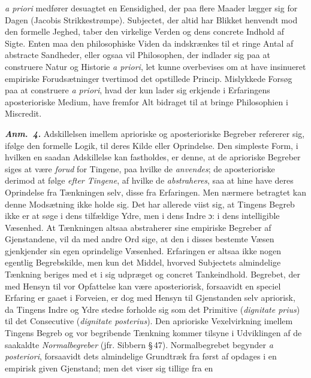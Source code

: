 \documentclass[12pt]{book}
\newcommand{\anm}[1]{\emph{\textbf{Anm.~#1.}}}
\newcommand{\dsi}{\textup{ɔ:}}
\newcommand{\opage}[1]{\marginnote{\footnotesize\textit{[#1]}}}
\begin{document}
\textit{a priori} medfører desuagtet en Eensidighed, der paa flere Maader
lægger sig for Dagen (Jacobis Strikkestrømpe). Subjectet, der altid har
Blikket henvendt mod den formelle Jeghed, taber den virkelige Verden og dens
concrete Indhold af Sigte. Enten maa den philosophiske Viden da indskrænkes
til et ringe Antal af abstracte Sandheder, eller ogsaa vil Philosophen, der
indlader sig paa at construere Natur og Historie \textit{a priori}, let kunne
overbevises om at have insinueret empiriske Forudsætninger tvertimod det
opstillede Princip. Mislykkede Forsøg paa at construere \textit{a priori},
hvad der kun lader sig erkjende i Erfaringens aposterioriske Medium, have
fremfor Alt bidraget til at bringe Philosophien i Miscredit.

\anm{4} Adskillelsen imellem aprioriske og aposterioriske Begreber refererer
sig, ifølge den formelle Logik, til deres Kilde eller Oprindelse. Den simpleste
Form, i hvilken en saadan Adskillelse kan fastholdes, er denne, at de
aprioriske Begreber siges at være \emph{forud} for Tingene, paa hvilke de
\emph{anvendes}; de aposterioriske derimod at følge \emph{efter Tingene}, af
hvilke de \emph{abstraheres}, saa at hine have deres Oprindelse fra
Tænkningen selv, disse fra Erfaringen. Men nærmere betragtet kan denne
Modsætning ikke holde sig. Det har allerede viist sig, at Tingens Begreb ikke
er at søge i dens tilfældige Ydre, men i dens Indre \dsi{} i dens intelligible
Væsenhed. At Tænkningen altsaa abstraherer sine empiriske
\opage{24} Begreber af Gjenstandene, vil da med andre Ord sige, at den i disses bestemte
Væsen gjenkjender sin egen oprindelige Væsenhed. Erfaringen er altsaa ikke
nogen egentlig Begrebskilde, men kun det Middel, hvorved Subjectets
almindelige Tænkning beriges med et i sig udpræget og concret Tankeindhold.
Begrebet, der med Hensyn til vor Opfattelse kan være aposteriorisk, forsaavidt
en speciel Erfaring er gaaet i Forveien, er dog med Hensyn til Gjenstanden
selv apriorisk, da Tingens Indre og Ydre stedse forholde sig som det Primitive
(\textit{dignitate prius}) til det Consecutive (\textit{dignitate
posterius}). Den aprioriske Vexelvirkning imellem Tingens Begreb og vor
begribende Tænkning kommer tilsyne i Udviklingen af de saakaldte
\emph{Normalbegreber} (jfr. Sibbern \S\,47). Normalbegrebet begynder
\textit{a posteriori}, forsaavidt dets almindelige Grundtræk fra først af
opdages i en empirisk given Gjenstand; men det viser sig tillige fra en
\end{document}
